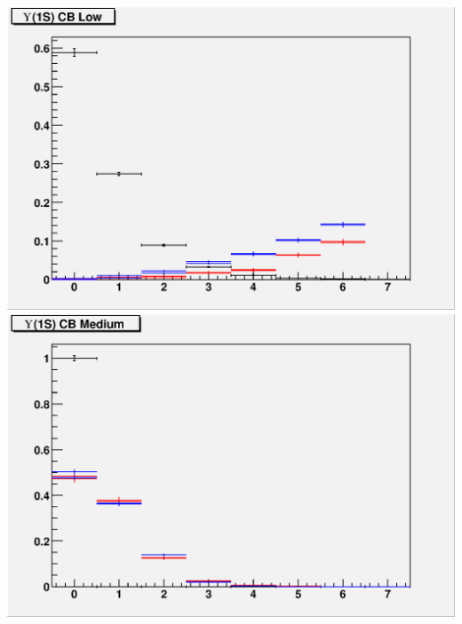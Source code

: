 \documentclass[12pt]{article}
\begin{document}
\includegraphics[width=\linewidth]{trigger1_cblo.eps}
\vfill
\includegraphics[width=\linewidth]{trigger1_cbmd.eps}
\end{document}
